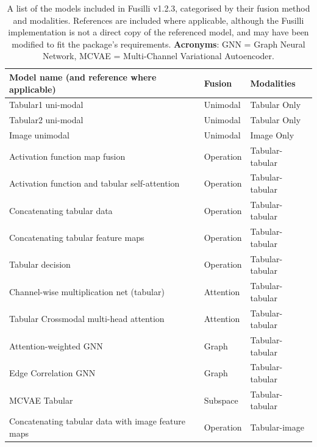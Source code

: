 \begin{table}[!ht]
    \caption{A list of the models included in Fusilli v1.2.3, categorised by their fusion method and modalities.
    References are included where applicable, although the Fusilli implementation is not a direct copy of the referenced model, and may have been modified to fit the package's requirements.
    \textbf{Acronyms}: GNN = Graph Neural Network, MCVAE = Multi-Channel Variational Autoencoder.}
    \label{}
    \centering
    \begin{tabular}{|p{8cm}ll|}
        \hline
        \textbf{Model name (and reference where applicable)} & \textbf{Fusion} & \textbf{Modalities} \\ \hline
        Tabular1 uni-modal & Unimodal & Tabular Only \\ \hline
        Tabular2 uni-modal & Unimodal & Tabular Only \\ \hline
        Image unimodal & Unimodal & Image Only \\ \hline
        Activation function map fusion~\cite{chenMDFNetApplicationMultimodal2023} & Operation & Tabular-tabular \\ \hline
        Activation function and tabular self-attention~\cite{chenMDFNetApplicationMultimodal2023} & Operation & Tabular-tabular \\ \hline
        Concatenating tabular data & Operation & Tabular-tabular \\ \hline 
        Concatenating tabular feature maps~\cite{gaoReducingUncertaintyCancer2022} & Operation & Tabular-tabular \\ \hline
        Tabular decision & Operation & Tabular-tabular \\ \hline 
        Channel-wise multiplication net (tabular)~\cite{duanmuPredictionPathologicalComplete2020}  & Attention & Tabular-tabular \\ \hline
        Tabular Crossmodal multi-head attention~\cite{golovanevskyMultimodalAttentionbasedDeep2022}  & Attention & Tabular-tabular \\ \hline
        Attention-weighted GNN~\cite{bintsiMultimodalBrainAge2023} & Graph & Tabular-tabular \\ \hline
        Edge Correlation GNN & Graph & Tabular-tabular \\ \hline 
        MCVAE Tabular~\cite{antelmiSparseMultiChannelVariational2019}  & Subspace & Tabular-tabular \\ \hline
        Concatenating tabular data with image feature maps~\cite{liFusingMetadataDermoscopy2020}  & Operation & Tabular-image \\ \hline

\end{tabular}
\end{table}
